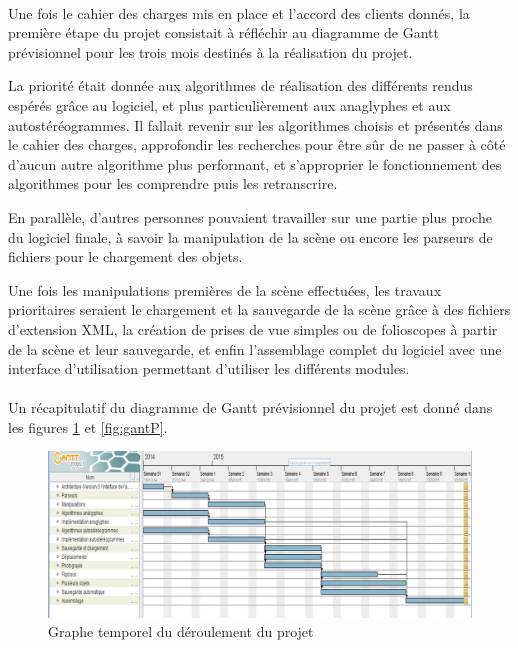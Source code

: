 \paragraph{}
Une fois le cahier des charges mis en place et l'accord des clients donnés, la première étape du projet consistait à réfléchir au diagramme de Gantt prévisionnel pour les trois mois destinés à la réalisation du projet.

La priorité était donnée aux algorithmes de réalisation des différents rendus espérés grâce au logiciel, et plus particulièrement aux anaglyphes et aux autostéréogrammes. Il fallait revenir sur les algorithmes choisis et présentés dans le cahier des charges, approfondir les recherches pour être sûr de ne passer à côté d'aucun autre algorithme plus performant, et s'approprier le fonctionnement des algorithmes pour les comprendre puis les retranscrire.

En parallèle, d'autres personnes pouvaient travailler sur une partie plus proche du logiciel finale, à savoir la manipulation de la scène ou encore les parseurs de fichiers pour le chargement des objets.

Une fois les manipulations premières de la scène effectuées, les travaux prioritaires seraient le chargement et la sauvegarde de la scène grâce à des fichiers d'extension XML, la création de prises de vue simples ou de folioscopes à partir de la scène et leur sauvegarde, et enfin l'assemblage complet du logiciel avec une interface d'utilisation permettant d'utiliser les différents modules.

\paragraph{}
Un récapitulatif du diagramme de Gantt prévisionnel du projet est donné dans les figures \ref{fig:graphGantP} et \ref{fig:gantP}.

\newpage
\begin{figure}[h]
	\centering
	\begin{sideways}
                \includegraphics[scale=0.42]{graphGantP.jpg}
        \end{sideways}
	\caption{\label{fig:graphGantP} Graphe temporel du déroulement du projet \protect \footnotemark }
\end{figure}

